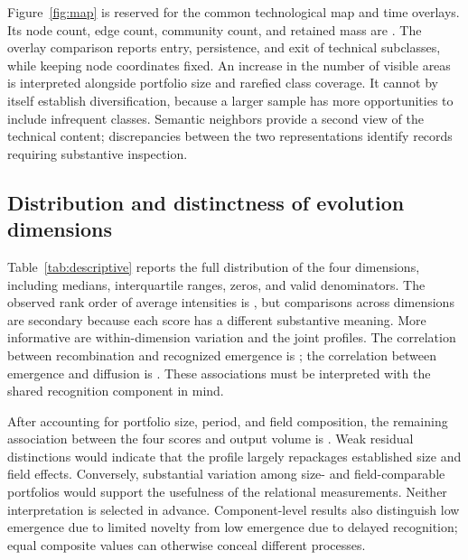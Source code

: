 Figure~\ref{fig:map} is reserved for the common technological map and time overlays.
Its node count, edge count, community count, and retained mass are
. The overlay comparison reports entry, persistence,
and exit of technical subclasses, while keeping node coordinates fixed. An increase
in the number of visible areas is interpreted alongside portfolio size and rarefied
class coverage. It cannot by itself establish diversification, because a larger
sample has more opportunities to include infrequent classes. Semantic neighbors
provide a second view of the technical content; discrepancies between the two
representations identify records requiring substantive inspection.



\subsection{Distribution and distinctness of evolution dimensions}
Table~\ref{tab:descriptive} reports the full distribution of the four dimensions,
including medians, interquartile ranges, zeros, and valid denominators. The observed
rank order of average intensities is , but comparisons across
dimensions are secondary because each score has a different substantive meaning.
More informative are within-dimension variation and the joint profiles. The
correlation between recombination and recognized emergence is
; the correlation between emergence
and diffusion is . These associations
must be interpreted with the shared recognition component in mind.

After accounting for portfolio size, period, and field composition, the remaining
association between the four scores and output volume is
. Weak residual distinctions would indicate that
the profile largely repackages established size and field effects. Conversely,
substantial variation among size- and field-comparable portfolios would support
the usefulness of the relational measurements. Neither interpretation is selected
in advance. Component-level results also distinguish low emergence due to limited
novelty from low emergence due to delayed recognition; equal composite values can
otherwise conceal different processes.



